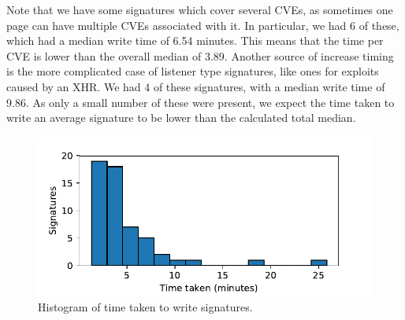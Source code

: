 Note that we have some signatures which cover several CVEs, as sometimes one page can have multiple CVEs associated with it. In particular, we had 6 of these, which had a median write time of 6.54 minutes. This means that the time per CVE is lower than the overall median of 3.89. Another source of increase timing is the more complicated case of listener type signatures, like ones for exploits caused by an XHR. We had 4 of these signatures, with a median write time of 9.86. As only a small number of these were present, we expect the time taken to write an average signature to be lower than the calculated total median.

\begin{figure}[h]
	\includegraphics[scale=0.5]{results/signature_times_small.pdf}
	\caption{Histogram of time taken to write signatures.}
	\label{fig:signature_times}
\end{figure}


